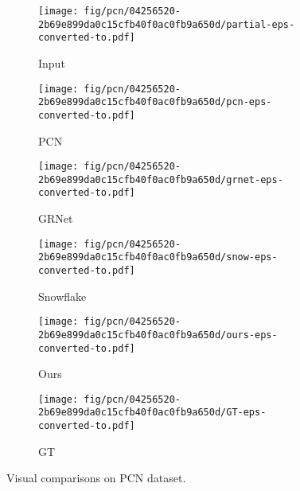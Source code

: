 \begin{figure*}[t]
	
	\vspace{5pt}
	
	\captionsetup[subfigure]{font=small,labelfont=small}
	\begin{subfigure}{\sunit}
		\centering
		\texttt{[image: fig/pcn/04256520-2b69e899da0c15cfb40f0ac0fb9a650d/partial-eps-converted-to.pdf]}
		\caption{Input}
	\end{subfigure}\hfill \begin{subfigure}{\sunit}
		\centering
		\texttt{[image: fig/pcn/04256520-2b69e899da0c15cfb40f0ac0fb9a650d/pcn-eps-converted-to.pdf]}
		\caption{PCN}
	\end{subfigure}\hfill \begin{subfigure}{\sunit}
		\centering
		\texttt{[image: fig/pcn/04256520-2b69e899da0c15cfb40f0ac0fb9a650d/grnet-eps-converted-to.pdf]}
		\caption{GRNet}
	\end{subfigure}\hfill \begin{subfigure}{\sunit}
		\centering
		\texttt{[image: fig/pcn/04256520-2b69e899da0c15cfb40f0ac0fb9a650d/snow-eps-converted-to.pdf]}
		\caption{Snowflake}
	\end{subfigure}\hfill \begin{subfigure}{\sunit}
		\centering
		\texttt{[image: fig/pcn/04256520-2b69e899da0c15cfb40f0ac0fb9a650d/ours-eps-converted-to.pdf]}
		\caption{Ours}
	\end{subfigure}\hfill \begin{subfigure}{\sunit}
		\centering
		\texttt{[image: fig/pcn/04256520-2b69e899da0c15cfb40f0ac0fb9a650d/GT-eps-converted-to.pdf]}
		\caption{GT}
	\end{subfigure}
	
	\vspace{5pt}
	\caption{Visual comparisons on PCN dataset.}
	\label{fig:pcn_more}
\end{figure*}





